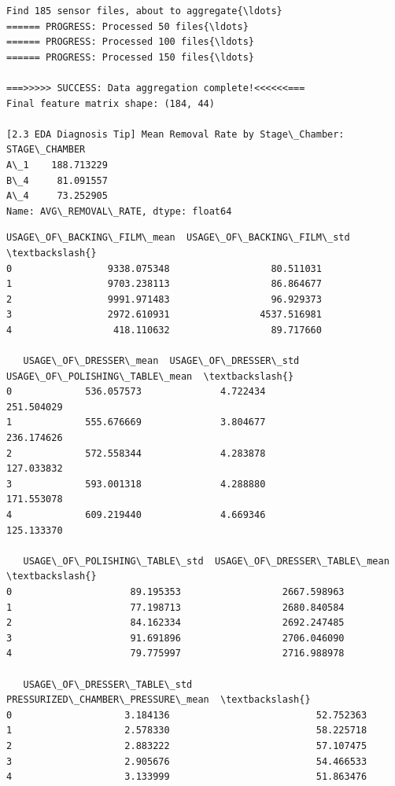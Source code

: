 \documentclass[11pt]{article}
\makeatletter
\newcommand{\boxspacing}{\kern\kvtcb@left@rule\kern\kvtcb@boxsep}
\newcommand{\prompt}[4]{
        {\ttfamily\llap{{\color{#2}[#3]:\hspace{3pt}#4}}\vspace{-\baselineskip}}
    }
\makeatother
\begin{document}
    \begin{Verbatim}[commandchars=\\\{\}]
Find 185 sensor files, about to aggregate{\ldots}
====== PROGRESS: Processed 50 files{\ldots}
====== PROGRESS: Processed 100 files{\ldots}
====== PROGRESS: Processed 150 files{\ldots}

===>>>>> SUCCESS: Data aggregation complete!<<<<<<===
Final feature matrix shape: (184, 44)

[2.3 EDA Diagnosis Tip] Mean Removal Rate by Stage\_Chamber:
STAGE\_CHAMBER
A\_1    188.713229
B\_4     81.091557
A\_4     73.252905
Name: AVG\_REMOVAL\_RATE, dtype: float64
    \end{Verbatim}

            \begin{tcolorbox}[breakable, size=fbox, boxrule=.5pt, pad at break*=1mm, opacityfill=0]
\prompt{Out}{outcolor}{ }{\boxspacing}
\begin{Verbatim}[commandchars=\\\{\}]
   USAGE\_OF\_BACKING\_FILM\_mean  USAGE\_OF\_BACKING\_FILM\_std  \textbackslash{}
0                 9338.075348                  80.511031
1                 9703.238113                  86.864677
2                 9991.971483                  96.929373
3                 2972.610931                4537.516981
4                  418.110632                  89.717660

   USAGE\_OF\_DRESSER\_mean  USAGE\_OF\_DRESSER\_std  USAGE\_OF\_POLISHING\_TABLE\_mean  \textbackslash{}
0             536.057573              4.722434                     251.504029
1             555.676669              3.804677                     236.174626
2             572.558344              4.283878                     127.033832
3             593.001318              4.288880                     171.553078
4             609.219440              4.669346                     125.133370

   USAGE\_OF\_POLISHING\_TABLE\_std  USAGE\_OF\_DRESSER\_TABLE\_mean  \textbackslash{}
0                     89.195353                  2667.598963
1                     77.198713                  2680.840584
2                     84.162334                  2692.247485
3                     91.691896                  2706.046090
4                     79.775997                  2716.988978

   USAGE\_OF\_DRESSER\_TABLE\_std  PRESSURIZED\_CHAMBER\_PRESSURE\_mean  \textbackslash{}
0                    3.184136                          52.752363
1                    2.578330                          58.225718
2                    2.883222                          57.107475
3                    2.905676                          54.466533
4                    3.133999                          51.863476


\end{Verbatim}
\end{tcolorbox}
\end{document}
